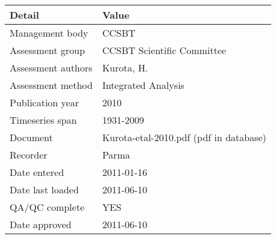 \begin{table}[htb]
\centering
\begin{tabular}{ll}
\toprule
Detail & Value \\
\midrule
Management body    & CCSBT                                  \\
Assessment group   & CCSBT Scientific Committee             \\
Assessment authors & Kurota, H.                             \\
Assessment method  & Integrated Analysis                    \\
Publication year   & 2010                                   \\
Timeseries span    & 1931-2009                              \\
Document           & Kurota-etal-2010.pdf (pdf in database) \\
Recorder           & Parma                                  \\
Date entered       & 2011-01-16                             \\
Date last loaded   & 2011-06-10                             \\
QA/QC complete     & YES                                    \\
Date approved      & 2011-06-10                             \\
\bottomrule
\end{tabular}
\label{tab:assessdet}
\end{table}
